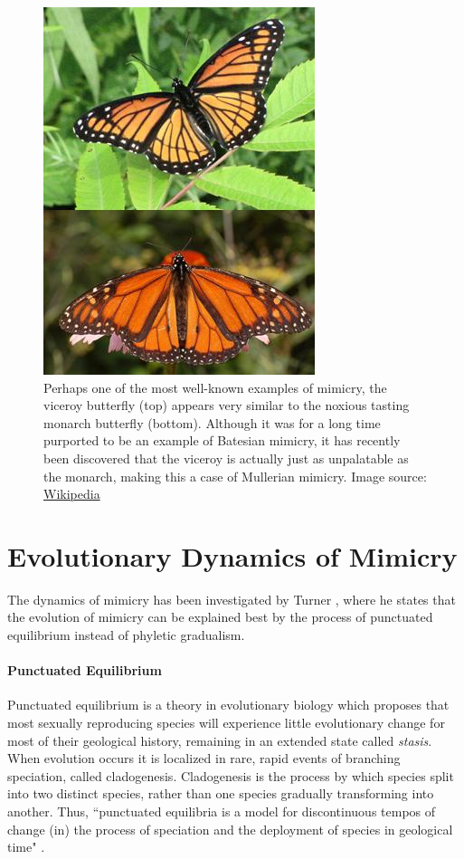 \begin{figure}[H]
	\centering
	\includegraphics[scale=0.75]{images/BatesMimButter}
	\caption{Perhaps one of the most well-known examples of mimicry, the viceroy butterfly (top) appears very similar to the noxious tasting monarch butterfly (bottom). Although it was for a long time purported to be an example of Batesian mimicry, it has recently been discovered that the viceroy is actually just as unpalatable as the monarch, making this a case of Mullerian mimicry. \cite{brower1991} Image source: \href{http://en.wikipedia.org/wiki/Mullerian_mimicry}{Wikipedia}}
	\label{fig:mullerian-butterfly}
\end{figure}

\section{Evolutionary Dynamics of Mimicry}
\label{sec:evolutionary-dynamics-of-mimicry}
The dynamics of mimicry has been investigated by Turner \cite{turner1988}, where he states that the evolution of mimicry can be explained best by the process of punctuated equilibrium instead of phyletic gradualism. 

\paragraph{Punctuated Equilibrium}
Punctuated equilibrium is a theory in evolutionary biology which proposes that most sexually reproducing species will experience little evolutionary change for most of their geological history, remaining in an extended state called \textit{stasis}. When evolution occurs it is localized in rare, rapid events of branching speciation, called cladogenesis. Cladogenesis is the process by which species split into two distinct species, rather than one species gradually transforming into another. Thus, ``punctuated equilibria is a model for discontinuous tempos of change (in) the process of speciation and the deployment of species in geological time" \cite{gould1977}. 


